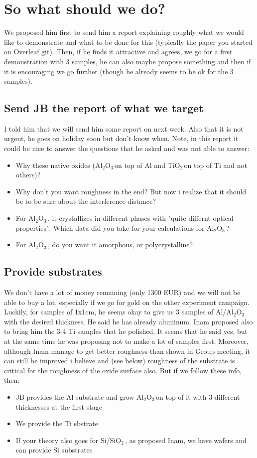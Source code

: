 \documentclass[11pt]{article}
\newcommand{\TiOO}{TiO$_2$\,}
\newcommand{\SiOO}{SiO$_2$\,}
\newcommand{\Alumina}{Al$_2$O$_3$\,}
\begin{document}
\pagebreak
\section{So what should we do?}

We proposed him first to send him a report explaining roughly what we would like to demonstrate and what to be done for this (typically the paper you started on Overleaf git). Then, if he finds it attractive and agrees, we go for a first demonstration with 3 samples, he can also maybe propose something and then if it is encouraging we go further (though he already seems to be ok for the 3 samples).

\subsection*{Send JB the report of what we target}

I told him that we will send him some report on next week. Also that it is not urgent, he goes on holiday soon but don't know when. Note, in this report it could be nice to answer the questions that he asked and was not able to answer:
\begin{itemize}
\item Why these native oxides (\Alumina on top of Al and \TiOO on top of Ti and not others)?
\item Why don't you want roughness in the end?  But now i realize that it should be to be sure about the interference distance?
\item For \Alumina, it crystallizes in different phases with "quite differnt optical properties". Which data did you take for your calculations for \Alumina?
\item For \Alumina, do you want it amorphous, or polycrystalline? 
\end{itemize}

\subsection*{Provide substrates}

We don't have a lot of money remaining (only 1300 EUR) and we will not be able to buy a lot, especially if we go for gold on the other experiment campaign. Luckily, for samples of 1x1cm, he seems okay to give us 3 samples of Al/\Alumina with the desired thickness. He said he has already aluminum. Inam proposed also to bring him the 3-4 Ti samples that he polished. It seems that he said yes, but at the same time he was proposing not to make a lot of samples first. Moreover, although Inam manage to get better roughness than shown in Group meeting, it can still be improved i believe and (see below) roughness of the substrate is critical for the roughness of the oxide surface also. But if we follow these info, then: 
\begin{itemize}
\item JB provides the Al substrate and grow \Alumina on top of it with 3 different thicknesses at the first stage
\item We provide the Ti sbstrate 
\item If your theory also goes for Si/\SiOO, as proposed Inam, we have wafers and can provide Si substrates
\end{itemize}
\end{document}
